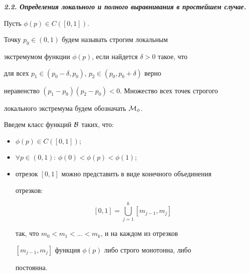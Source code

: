 \hypertarget{p2.2}{}



{\bf \itshape 2.2. Определения локального и полного выравнивания в простейшем случае.}



\begin{definition}[2]Пусть $\phi(p)\in C([0,1])$. 

Точку $p_0\in(0,1)$ будем называть строгим локальным

экстремумом функции $\phi(p)$, если найдется $\delta>0$ такое, что

для всех $p_1\in(p_0-\delta,p_0)$, $p_2\in(p_0,p_0+\delta)$ верно

неравенство $(p_1-p_0)(p_2-p_0)<0$. Множество всех точек строгого

локального экстремума будем обозначать ${\cal M}_{\phi}$.

\end{definition}



\smallskip



\begin{definition}[3]Введем класс функций ${\cal B}$ таких, что:

\begin{itemize}

\item[1)] $\phi(p)\in C([0,1])$;

\item[2)] \hypertarget{def.3.2}{} $\forall p\in(0,1):~\phi(0)<\phi(p)<\phi(1)$;

\item[3)] отрезок $[0,1]$ можно представить в виде конечного объединения

отрезков:

$$

[0,1]=\bigcup\limits_{j=1}^k[m_{j-1},m_j]

$$

так, что $m_0<m_1<\dots<m_k$, и на каждом из отрезков

$[m_{j-1},m_j]$ функция $\phi(p)$ либо строго монотонна, либо

постоянна.



\end{itemize}

\end{definition}



\smallskip



